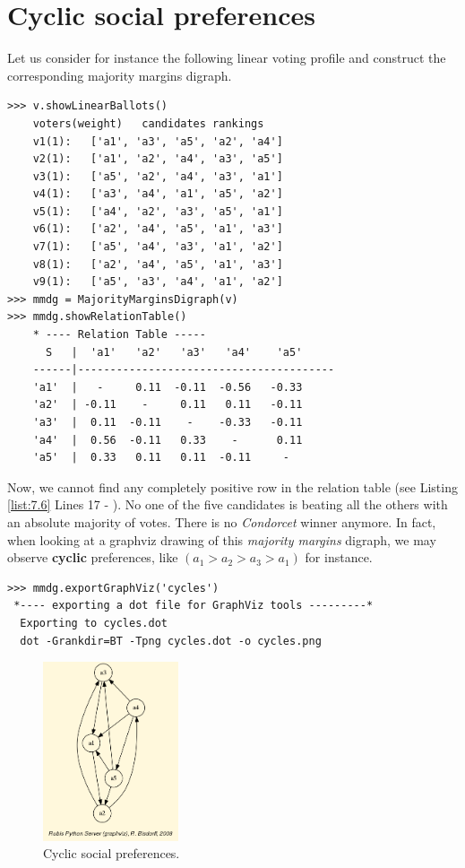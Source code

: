 \section{Cyclic social preferences}
\label{sec:7.4}

Let us consider for instance the following linear voting profile and construct the corresponding majority margins digraph.

\begin{lstlisting}[caption={Example of cyclic social preferences},label=list:7.6,basicstyle=\footnotesize]
>>> v.showLinearBallots()
    voters(weight)	 candidates rankings
    v1(1): 	 ['a1', 'a3', 'a5', 'a2', 'a4']
    v2(1): 	 ['a1', 'a2', 'a4', 'a3', 'a5']
    v3(1): 	 ['a5', 'a2', 'a4', 'a3', 'a1']
    v4(1): 	 ['a3', 'a4', 'a1', 'a5', 'a2']
    v5(1): 	 ['a4', 'a2', 'a3', 'a5', 'a1']
    v6(1): 	 ['a2', 'a4', 'a5', 'a1', 'a3']
    v7(1): 	 ['a5', 'a4', 'a3', 'a1', 'a2']
    v8(1): 	 ['a2', 'a4', 'a5', 'a1', 'a3']
    v9(1): 	 ['a5', 'a3', 'a4', 'a1', 'a2']
>>> mmdg = MajorityMarginsDigraph(v)
>>> mmdg.showRelationTable()
    * ---- Relation Table -----
      S   |  'a1'   'a2'   'a3'	  'a4'	  'a5'	  
    ------|----------------------------------------
    'a1'  |   -     0.11  -0.11	 -0.56	 -0.33	 
    'a2'  | -0.11    -	   0.11	  0.11	 -0.11	 
    'a3'  |  0.11  -0.11    -	 -0.33	 -0.11	 
    'a4'  |  0.56  -0.11   0.33	   -	  0.11	 
    'a5'  |  0.33   0.11   0.11	 -0.11	   -	 
\end{lstlisting}    

Now, we cannot find any completely positive row in the relation table (see Listing \ref{list:7.6} Lines 17 - ). No one of the five candidates is beating all the others with an absolute majority of votes. There is no \emph{Condorcet} winner anymore. In fact, when looking at a graphviz drawing of this \emph{majority margins} digraph, we may observe \textbf{cyclic} preferences, like $(a_1 > a_2 > a_3 > a_1)$ for instance.

\begin{lstlisting}[basicstyle=\footnotesize]
>>> mmdg.exportGraphViz('cycles')
 *---- exporting a dot file for GraphViz tools ---------*
  Exporting to cycles.dot
  dot -Grankdir=BT -Tpng cycles.dot -o cycles.png
\end{lstlisting}

\begin{figure}[h]
\sidecaption
\includegraphics[width=4cm]{Figures/cycles.png}
\caption{Cyclic social preferences.}
\label{fig:7.2}       %
\end{figure}
	   
